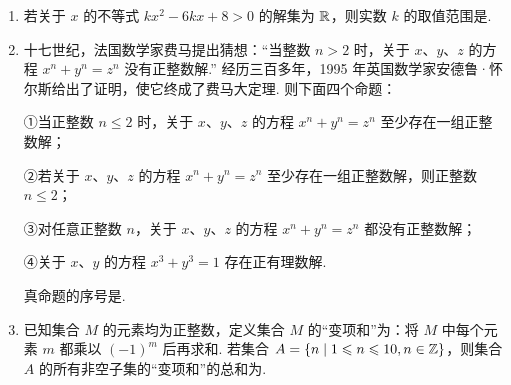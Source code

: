 \documentclass[a4paper,11pt]{article}
\begin{document}
\begin{enumerate}
\ifanswer
\solbegin
{}
\solend
\fi

\item 若关于 $x$ 的不等式 $kx^2-6kx+8>0$ 的解集为 $\mathbb{R}$，则实数 $k$ 的取值范围是\blankline[4.4em].

\ifanswer
\solbegin
{}
\step{因此 $k\in\left[0,\dfrac89\right)$.}
\solend
\fi

\item 十七世纪，法国数学家费马提出猜想：“当整数 $n>2$ 时，关于 $x$、$y$、$z$ 的方程 $x^n+y^n=z^n$ 没有正整数解.” 经历三百多年，1995 年英国数学家安德鲁·怀尔斯给出了证明，使它终成了费马大定理. 则下面四个命题：

①当正整数 $n\leqslant2$ 时，关于 $x$、$y$、$z$ 的方程 $x^n+y^n=z^n$ 至少存在一组正整数解；

②若关于 $x$、$y$、$z$ 的方程 $x^n+y^n=z^n$ 至少存在一组正整数解，则正整数 $n\leqslant2$；

③对任意正整数 $n$，关于 $x$、$y$、$z$ 的方程 $x^n+y^n=z^n$ 都没有正整数解；

④关于 $x$、$y$ 的方程 $x^3+y^3=1$ 存在正有理数解.

真命题的序号是\blankline[4.4em].

\ifanswer
\solbegin
{}
\solend
\fi

\item 已知集合 $M$ 的元素均为正整数，定义集合 $M$ 的“变项和”为：将 $M$ 中每个元素 $m$ 都乘以 $(-1)^m$ 后再求和. 若集合 $A=\{n\mid 1\leqslant n\leqslant10,n\in\mathbb{Z}\}$，则集合 $A$ 的所有非空子集的“变项和”的总和为\blankline[4.4em].

\ifanswer
\solbegin
{}
\solend
\fi

\end{enumerate}
\end{document}
